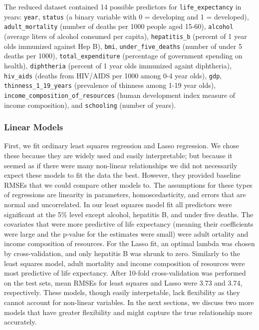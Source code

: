 \documentclass[]{article}
\begin{document}
The reduced dataset contained 14 possible predictors for
\texttt{life\_expectancy} in years: \texttt{year}, \texttt{status} (a
binary variable with 0 = developing and 1 = developed),
\texttt{adult\_mortality} (number of deaths per 1000 people aged 15-60),
\texttt{alcohol} (average liters of alcohol consumed per capita),
\texttt{hepatitis\_b} (percent of 1 year olds immunized against Hep B),
\texttt{bmi}, \texttt{under\_five\_deaths} (number of under 5 deaths per
1000), \texttt{total\_expenditure} (percentage of government spending on
health), \texttt{diphtheria} (percent of 1 year olds immunized againt
diphtheria), \texttt{hiv\_aids} (deaths from HIV/AIDS per 1000 among 0-4
year olds), \texttt{gdp}, \texttt{thinness\_1\_19\_years} (prevalence of
thinness among 1-19 year olds),
\texttt{income\_composition\_of\_resources} (human development index
measure of income composition), and \texttt{schooling} (number of
years).

\subsubsection{Linear Models}\label{linear-models}

First, we fit ordinary least squares regression and Lasso regression. We
chose these because they are widely used and easily interpretable; but
because it seemed as if there were many non-linear relationships we did
not necessarily expect these models to fit the data the best. However,
they provided baseline RMSEs that we could compare other models to. The
assumptions for these types of regressions are linearity in parameters,
homoscedasticity, and errors that are normal and uncorrelated. In our
least squares model fit all predictors were significant at the 5\% level
except alcohol, hepatitis B, and under five deaths. The covariates that
were more predictive of life expectancy (meaning their coefficients were
large and the p-value for the estimates were small) were adult ortality
and income composition of resources. For the Lasso fit, an optimal
lambda was chosen by cross-validation, and only hepatitis B was shrunk
to zero. Similarly to the least squares model, adult mortality and
income composition of resources were most predictive of life expectancy.
After 10-fold cross-validation was performed on the test sets, mean
RMSEs for least squares and Lasso were 3.73 and 3.74, respectively.
These models, though easily interpetable, lack flexibility as they
cannot account for non-linear variables. In the next sections, we
discuss two more models that have greater flexibility and might capture
the true relationship more accurately.
\end{document}
